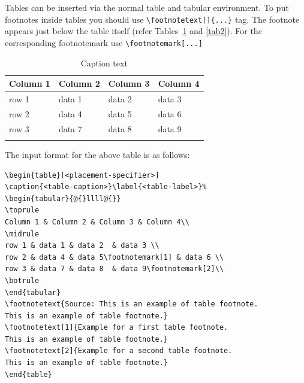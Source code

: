 \documentclass[pdflatex,sn-mathphys-ay]{sn-jnl}
\begin{document}
Tables can be inserted via the normal table and tabular environment. To put
footnotes inside tables you should use \verb+\footnotetext[]{...}+ tag.
The footnote appears just below the table itself (refer Tables~\ref{tab1} and \ref{tab2}). 
For the corresponding footnotemark use \verb+\footnotemark[...]+

\begin{table}[h]
\caption{Caption text}\label{tab1}%
\begin{tabular}{@{}llll@{}}
\toprule
Column 1 & Column 2  & Column 3 & Column 4\\
\midrule
row 1    & data 1   & data 2  & data 3  \\
row 2    & data 4   & data 5\footnotemark[1]  & data 6  \\
row 3    & data 7   & data 8  & data 9\footnotemark[2]  \\
\botrule
\end{tabular}
\end{table}

\noindent
The input format for the above table is as follows:

\bigskip
\begin{verbatim}
\begin{table}[<placement-specifier>]
\caption{<table-caption>}\label{<table-label>}%
\begin{tabular}{@{}llll@{}}
\toprule
Column 1 & Column 2 & Column 3 & Column 4\\
\midrule
row 1 & data 1 & data 2	 & data 3 \\
row 2 & data 4 & data 5\footnotemark[1] & data 6 \\
row 3 & data 7 & data 8	 & data 9\footnotemark[2]\\
\botrule
\end{tabular}
\footnotetext{Source: This is an example of table footnote. 
This is an example of table footnote.}
\footnotetext[1]{Example for a first table footnote.
This is an example of table footnote.}
\footnotetext[2]{Example for a second table footnote. 
This is an example of table footnote.}
\end{table}
\end{verbatim}
\bigskip
\end{document}
